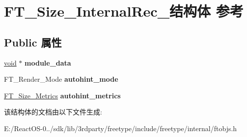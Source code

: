 \hypertarget{struct_f_t___size___internal_rec__}{}\section{F\+T\+\_\+\+Size\+\_\+\+Internal\+Rec\+\_\+结构体 参考}
\label{struct_f_t___size___internal_rec__}
\subsection*{Public 属性}
\begin{DoxyCompactItemize}
\item 
\mbox{\label{struct_f_t___size___internal_rec___a9232269256747dc8b51d6cf6098578c1}} 
\hyperlink{interfacevoid}{void} $\ast$ {\bfseries module\+\_\+data}
\item 
\mbox{\label{struct_f_t___size___internal_rec___aedfc39ea690f7e4656aa388b25b9ae1b}} 
F\+T\+\_\+\+Render\+\_\+\+Mode {\bfseries autohint\+\_\+mode}
\item 
\mbox{\label{struct_f_t___size___internal_rec___a1cd74fe9612083267bb5f3f50d131bc0}} 
\hyperlink{struct_f_t___size___metrics__}{F\+T\+\_\+\+Size\+\_\+\+Metrics} {\bfseries autohint\+\_\+metrics}
\end{DoxyCompactItemize}


该结构体的文档由以下文件生成\+:\begin{DoxyCompactItemize}
\item 
E\+:/\+React\+O\+S-\/0../sdk/lib/3rdparty/freetype/include/freetype/internal/ftobjs.\+h\end{DoxyCompactItemize}

